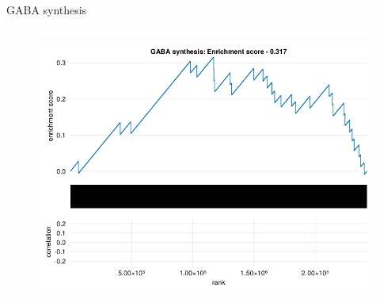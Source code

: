 \begin{frame}{GABA synthesis}
    \begin{columns}[c] %

        \begin{figure}
            \includegraphics[width=1\linewidth]{../figures/fsea_GABA-synthesis.png}
        \end{figure}

    \end{columns}

\end{frame}

